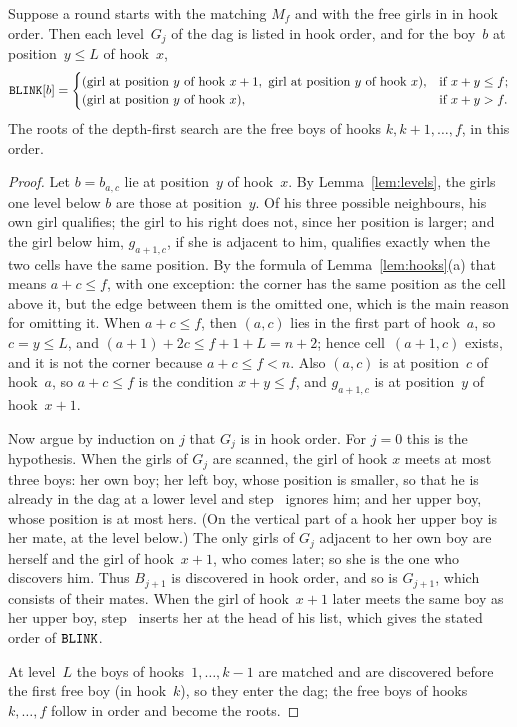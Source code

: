 \begin{lemma}
\label{lem:bfs}
Suppose a round starts with the matching $M_f$ and with the free girls in
 in hook order. Then each level~$G_j$ of the dag is listed in hook
order, and for the boy~$b$ at position~$y\le L$ of hook~$x$,
\[
  \texttt{BLINK}[b]=\begin{cases}
   (\text{girl at position~$y$ of hook~$x+1$},\ \text{girl at position~$y$ of hook~$x$}),&\text{if } x+y\le f;\\
   (\text{girl at position~$y$ of hook~$x$}),&\text{if } x+y>f.
  \end{cases}
\]
The roots of the depth-first search are the free boys of hooks
$k,k+1,\ldots,f$, in this order.
\end{lemma}

\begin{proof}
Let $b=b_{a,c}$ lie at position~$y$ of hook~$x$. By
Lemma~\ref{lem:levels}, the girls one level below $b$ are those at
position~$y$. Of his three possible neighbours, his own girl qualifies;
the girl to his right does not, since her position is larger; and the girl
below him, $g_{a+1,c}$, if she is adjacent to him, qualifies exactly when
the two cells have the same position. By the formula of
Lemma~\ref{lem:hooks}(a) that means $a+c\le f$, with one exception: the
corner has the same position as the cell above it, but the edge between
them is the omitted one, which is the main reason for omitting it. When
$a+c\le f$, then $(a,c)$ lies in the first part of hook~$a$, so $c=y\le L$,
and $(a+1)+2c\le f+1+L=n+2$; hence cell~$(a+1,c)$ exists, and it is not the
corner because $a+c\le f<n$. Also $(a,c)$ is at
position~$c$ of hook~$a$, so $a+c\le f$ is the condition $x+y\le f$, and
$g_{a+1,c}$ is at position~$y$ of hook~$x+1$.

Now argue by induction on $j$ that $G_j$ is in hook order. For $j=0$ this
is the hypothesis. When the girls of $G_j$ are scanned, the girl of hook
$x$ meets at most three boys: her own boy; her left boy, whose position is
smaller, so that he is already in the dag at a lower level and step~
ignores him; and her upper boy, whose position is at most hers. (On the
vertical part of a hook her upper boy is her mate, at the level below.) The
only girls of $G_j$ adjacent to her own boy are herself and the girl of
hook~$x+1$, who comes later; so she is the one who discovers him. Thus $B_{j+1}$
is discovered in hook order, and so is $G_{j+1}$, which consists of their
mates. When the girl of hook~$x+1$ later meets the same boy as her upper
boy, step~ inserts her at the head of his list, which gives the stated
order of $\texttt{BLINK}$.

At level~$L$ the boys of hooks~$1,\ldots,k-1$ are matched and are
discovered before the first free boy (in hook~$k$), so they enter the
dag; the free boys of hooks~$k,\ldots,f$ follow in order and become the
roots.
\end{proof}

